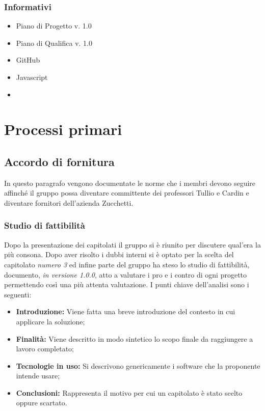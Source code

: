 \documentclass{article}
\begin{document}
    \subsubsection{Informativi}
    \begin{itemize}
        \item Piano di Progetto v. 1.0
        \item Piano di Qualifica v. 1.0
        \item GitHub
        \item Javascript
        \item 
    \end{itemize}


\newpage

\section{Processi primari}
    \subsection{Accordo di fornitura}
    In questo paragrafo vengono documentate le norme che i membri devono seguire affinché il gruppo possa diventare committente dei professori Tullio e Cardin e diventare fornitori dell'azienda Zucchetti.
        \subsubsection{Studio di fattibilità}
        Dopo la presentazione dei capitolati il gruppo si è riunito per discutere qual'era la più consona. Dopo aver risolto i dubbi interni si è optato per la scelta del capitolato \textit{numero 3} ed infine parte del gruppo ha steso lo studio di fattibilità, documento, \textit{in versione 1.0.0},  atto a valutare i pro e i contro di ogni progetto permettendo così una più attenta valutazione. \newline
        I punti chiave dell'analisi sono i seguenti:
    \begin{itemize}
	   \item \textbf{Introduzione:} Viene fatta una breve introduzione del contesto in cui applicare la soluzione;
	   \item \textbf{Finalità: } Viene descritto in modo sintetico lo scopo finale da raggiungere a lavoro completato;
	   \item \textbf{Tecnologie in uso:} Si descrivono genericamente i software che la proponente intende usare;
	   \item \textbf{Conclusioni:} Rappresenta il motivo per cui un capitolato è stato scelto oppure scartato.
    \end{itemize}
\end{document}
